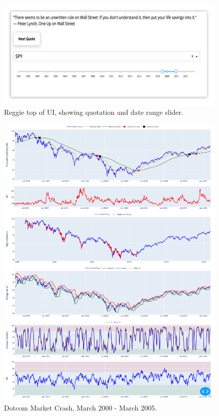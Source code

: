\documentclass[conference]{IEEEtran}
\begin{document}
\begin{figure}[h]
    \centering
    \includegraphics[width=\textwidth]{Figure_01.png}
    \caption{Reggie top of UI, showing quotation and date range slider.}
    \label{fig:fig1}
\end{figure}

\begin{figure}[h]
    \centering
    \includegraphics[width=\textwidth]{Figure_02.png}
    \caption{Dotcom Market Crash, March 2000 - March 2005.}
    \label{fig:fig2}
\end{figure}
\end{document}
